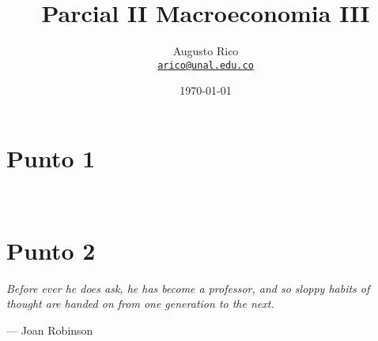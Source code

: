 \documentclass[11pt]{article}
\title{Parcial II Macroeconomia III
}
\author{Augusto Rico\\
    \href{mailto:arico@unal.edu.co}{\texttt{arico@unal.edu.co}}
    }
\date{\today}
\begin{document}
\maketitle


\section{Punto 1}

\begin{flushleft}
    ~\\
\end{flushleft}

\newpage

\section{Punto 2}

\epigraph{ \itshape Before ever he does ask, he has become a professor, and so sloppy habits of thought are handed on from one generation to the next.}
            {--- Joan Robinson }
\end{document}
